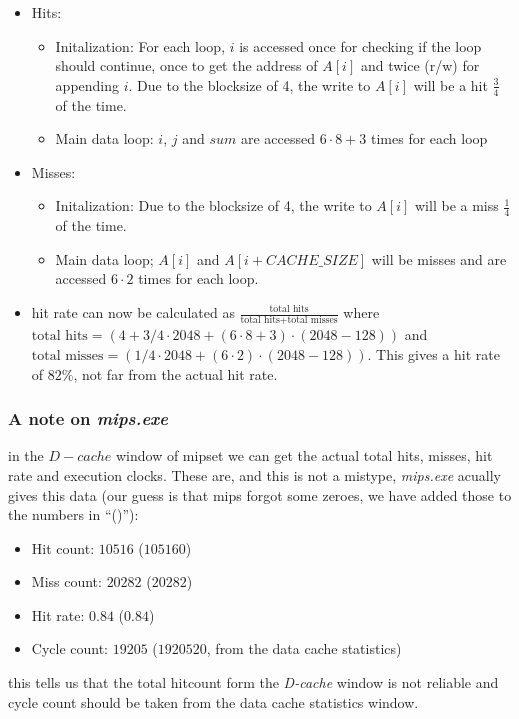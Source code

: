 \begin{itemize}
  \item Hits:
  \begin{itemize}
    \item Initalization: For each loop, $i$ is accessed once for checking if the
    loop should continue, once to get the address of $A[i]$ and twice (r/w) for
    appending $i$.
    Due to the blocksize of 4, the write to $A[i]$ will be a hit
    $\frac{3}{4}$ of the time.
    \item Main data loop: $i$, $j$ and $sum$ are accessed $6\cdot 8 + 3$ times
    for each loop
  \end{itemize}
  \item Misses:
  \begin{itemize}
    \item Initalization: Due to the blocksize of 4, the write to $A[i]$ will be
    a miss $\frac{1}{4}$ of the time.
    \item Main data loop; $A[i]$ and $A[i + CACHE\_SIZE]$ will be misses and are
    accessed $6\cdot 2$ times for each loop.
  \end{itemize}
  \item hit rate can now be calculated as $\frac{\mbox{total
  hits}}{\mbox{total hits}+\mbox{total misses}}$ where $\mbox{total hits} =
  (4+3/4\cdot2048 + (6\cdot8+3)\cdot(2048-128))$ and $\mbox{total misses} =
  (1/4\cdot2048 + (6\cdot2)\cdot(2048-128))$. This gives a hit rate of $82\%$,
  not far from the actual hit rate.
\end{itemize}
\subsubsection{A note on \emph{mips.exe}} in the $D-cache$ window of mipset we
can get the actual total hits, misses, hit rate and execution clocks. These are, and
this is not a mistype, \emph{mips.exe} acually gives this data (our guess is
that mips forgot some zeroes, we have added those to the numbers in ``()''):
\begin{itemize}
  \item Hit count: $10516$ ($105160$)
  \item Miss count: $20282$ ($20282$)
  \item Hit rate: $0.84$ ($0.84$)
  \item Cycle count: $19205$ ($1920520$, from the data cache statistics)
\end{itemize}
this tells us that the total hitcount form the \emph{D-cache} window is not
reliable and cycle count should be taken from the data cache statistics window.

